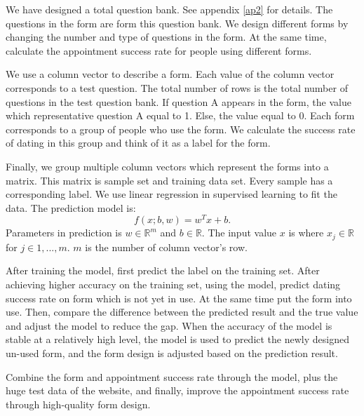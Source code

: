We have designed a total question bank. See appendix \ref{ap2} for details. The questions in the form are form this question bank. We design different forms by changing the number and type of questions in the form. At the same time, calculate the appointment success rate for people using different forms.\par 
We use a column vector to describe a form. Each value of the column vector corresponds to a test question. The total number of rows is the total number of questions in the test question bank. If question A appears in the form, the value which representative question A equal to 1. Else, the value equal to 0. Each form corresponds to a group of people who use the form. We calculate the success rate of dating in this group and think of it as a label for the form.\par
Finally, we group multiple column vectors which represent the forms into a matrix. This matrix is sample set and training data set. Every sample has a corresponding label. We use linear regression in supervised learning to fit the data. The prediction model is: \[f(x;b,w)=w^Tx+b.\] Parameters in prediction is $w \in \mathbb{R}^m$ and $b \in \mathbb{R}$. The input value $x$ is where $ x_j \in \mathbb{R}$ for $ j \in 1,...,m$. $m$ is the number of column vector's row.\par 
After training the model, first predict the label on the training set. After achieving higher accuracy on the training set, using the model, predict dating success rate on form which is not yet in use. At the same time put the form into use. Then, compare the difference between the predicted result and the true value and adjust the model to reduce the gap. When the accuracy of the model is stable at a relatively high level, the model is used to predict the newly designed un-used form, and the form design is adjusted based on the prediction result.\par 
Combine the form and appointment success rate through the model, plus the huge test data of the website, and finally, improve the appointment success rate through high-quality form design.

